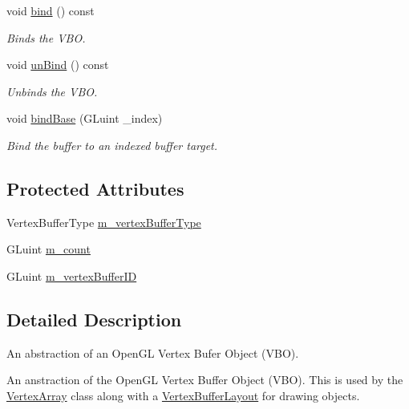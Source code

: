 \begin{DoxyCompactItemize}
void \hyperlink{class_cookie_eng_1_1_graphics_1_1_vertex_buffer_a6fbaa64c5edeb00d4f5770587eb7b369}{bind} () const
\begin{DoxyCompactList}\small\item\em Binds the V\+BO. \end{DoxyCompactList}\item 
void \hyperlink{class_cookie_eng_1_1_graphics_1_1_vertex_buffer_a8fbc3f39762c511438bc13e8c405926c}{un\+Bind} () const
\begin{DoxyCompactList}\small\item\em Unbinds the V\+BO. \end{DoxyCompactList}\item 
void \hyperlink{class_cookie_eng_1_1_graphics_1_1_vertex_buffer_a3098cec29d253dd295586fc92bc48001}{bind\+Base} (G\+Luint \+\_\+index)
\begin{DoxyCompactList}\small\item\em Bind the buffer to an indexed buffer target. \end{DoxyCompactList}\end{DoxyCompactItemize}
\subsection*{Protected Attributes}
\begin{DoxyCompactItemize}
\item 
Vertex\+Buffer\+Type \hyperlink{class_cookie_eng_1_1_graphics_1_1_vertex_buffer_a37d75d306f50db1b63c22b51912402cc}{m\+\_\+vertex\+Buffer\+Type}
\item 
G\+Luint \hyperlink{class_cookie_eng_1_1_graphics_1_1_vertex_buffer_a280a08a319717cf425435efd9b912ef3}{m\+\_\+count}
\item 
G\+Luint \hyperlink{class_cookie_eng_1_1_graphics_1_1_vertex_buffer_af4c00fbd9352dd8a0b5952c007037e2e}{m\+\_\+vertex\+Buffer\+ID}
\end{DoxyCompactItemize}


\subsection{Detailed Description}
An abstraction of an Open\+GL Vertex Bufer Object (V\+BO). 

An anstraction of the Open\+GL Vertex Buffer Object (V\+BO). This is used by the \hyperlink{class_cookie_eng_1_1_graphics_1_1_vertex_array}{Vertex\+Array} class along with a \hyperlink{class_cookie_eng_1_1_graphics_1_1_vertex_buffer_layout}{Vertex\+Buffer\+Layout} for drawing objects. 

